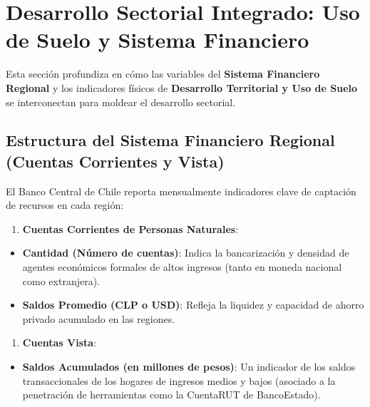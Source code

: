 \documentclass[11pt,a4paper]{article}
\begin{document}
\strut


\section{Desarrollo Sectorial Integrado: Uso de Suelo y Sistema Financiero}

Esta sección profundiza en cómo las variables del \textbf{Sistema Financiero Regional} y los indicadores físicos de \textbf{Desarrollo Territorial y Uso de Suelo} se interconectan para moldear el desarrollo sectorial.


\subsection{Estructura del Sistema Financiero Regional (Cuentas Corrientes y Vista)}
El Banco Central de Chile reporta mensualmente indicadores clave de captación de recursos en cada región:
\begin{enumerate}
  \item \textbf{Cuentas Corrientes de Personas Naturales}:
\end{enumerate}
\begin{itemize}
  \item \textbf{Cantidad (Número de cuentas)}: Indica la bancarización y densidad de agentes económicos formales de altos ingresos (tanto en moneda nacional como extranjera).
  \item \textbf{Saldos Promedio (CLP o USD)}: Refleja la liquidez y capacidad de ahorro privado acumulado en las regiones.
\end{itemize}
\begin{enumerate}
  \item \textbf{Cuentas Vista}:
\end{enumerate}
\begin{itemize}
  \item \textbf{Saldos Acumulados (en millones de pesos)}: Un indicador de los saldos transaccionales de los hogares de ingresos medios y bajos (asociado a la penetración de herramientas como la CuentaRUT de BancoEstado).

\end{itemize}
\end{document}
